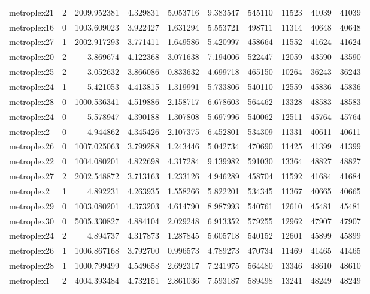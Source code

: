 \documentclass[../../../thesis.tex]{subfiles}
\begin{document}
\begin{longtable}{|l|r|r|r|r|r|r|r|r|r|}
metroplex21 & 2 & 2009.952381 & 4.329831 & 5.053716 & 9.383547 & 545110 & 11523 & 41039 & 41039 \\
metroplex16 & 0 & 1003.609023 & 3.922427 & 1.631294 & 5.553721 & 498711 & 11314 & 40648 & 40648 \\
metroplex27 & 1 & 2002.917293 & 3.771411 & 1.649586 & 5.420997 & 458664 & 11552 & 41624 & 41624 \\
metroplex20 & 2 & 3.869674 & 4.122368 & 3.071638 & 7.194006 & 522447 & 12059 & 43590 & 43590 \\
metroplex25 & 2 & 3.052632 & 3.866086 & 0.833632 & 4.699718 & 465150 & 10264 & 36243 & 36243 \\
metroplex24 & 1 & 5.421053 & 4.413815 & 1.319991 & 5.733806 & 540110 & 12559 & 45836 & 45836 \\
metroplex28 & 0 & 1000.536341 & 4.519886 & 2.158717 & 6.678603 & 564462 & 13328 & 48583 & 48583 \\
metroplex24 & 0 & 5.578947 & 4.390188 & 1.307808 & 5.697996 & 540062 & 12511 & 45764 & 45764 \\
metroplex2 & 0 & 4.944862 & 4.345426 & 2.107375 & 6.452801 & 534309 & 11331 & 40611 & 40611 \\
metroplex26 & 0 & 1007.025063 & 3.799288 & 1.243446 & 5.042734 & 470690 & 11425 & 41399 & 41399 \\
metroplex22 & 0 & 1004.080201 & 4.822698 & 4.317284 & 9.139982 & 591030 & 13364 & 48827 & 48827 \\
metroplex27 & 2 & 2002.548872 & 3.713163 & 1.233126 & 4.946289 & 458704 & 11592 & 41684 & 41684 \\
metroplex2 & 1 & 4.892231 & 4.263935 & 1.558266 & 5.822201 & 534345 & 11367 & 40665 & 40665 \\
metroplex29 & 0 & 1003.080201 & 4.373203 & 4.614790 & 8.987993 & 540761 & 12610 & 45481 & 45481 \\
metroplex30 & 0 & 5005.330827 & 4.884104 & 2.029248 & 6.913352 & 579255 & 12962 & 47907 & 47907 \\
metroplex24 & 2 & 4.894737 & 4.317873 & 1.287845 & 5.605718 & 540152 & 12601 & 45899 & 45899 \\
metroplex26 & 1 & 1006.867168 & 3.792700 & 0.996573 & 4.789273 & 470734 & 11469 & 41465 & 41465 \\
metroplex28 & 1 & 1000.799499 & 4.549658 & 2.692317 & 7.241975 & 564480 & 13346 & 48610 & 48610 \\
metroplex1 & 2 & 4004.393484 & 4.732151 & 2.861036 & 7.593187 & 589498 & 13241 & 48249 & 48249 \\

\end{longtable}
\end{document}
